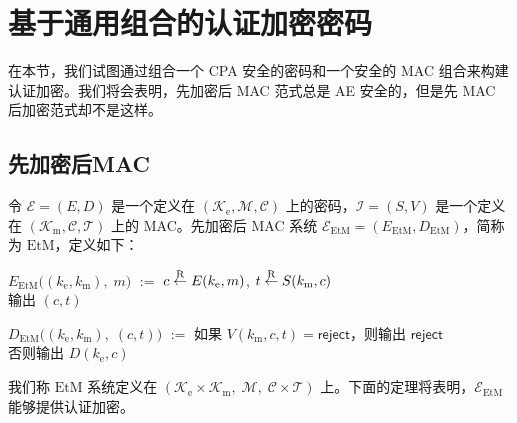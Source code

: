 \section{基于通用组合的认证加密密码}\label{sec:9-4}

在本节，我们试图通过组合一个 CPA 安全的密码和一个安全的 MAC 组合来构建认证加密。我们将会表明，先加密后 MAC 范式总是 AE 安全的，但是先 MAC 后加密范式却不是这样。

\subsection{先加密后MAC}\label{subsec:9-4-1}

令 $\mathcal{E}=(E,D)$ 是一个定义在 $(\mathcal{K}_\mathrm{e},\mathcal{M},\mathcal{C})$ 上的密码，$\mathcal{I}=(S,V)$ 是一个定义在 $(\mathcal{K}_\mathrm{m},\mathcal{C},\mathcal{T})$ 上的 MAC。先加密后 MAC 系统 $\mathcal{E}_\mathrm{EtM}=(E_\mathrm{EtM},D_\mathrm{EtM})$，简称为 $\mathrm{EtM}$，定义如下：

\vspace*{10pt}

\hspace*{20pt} $E_\mathrm{EtM}\big((k_\mathrm{e},k_\mathrm{m}),\;m\big)$
				\quad $:=$ \quad
				$c\overset{\rm R}\leftarrow E(k_\mathrm{e},m)$,
				\quad
				$t\overset{\rm R}\leftarrow S(k_\mathrm{m},c)$\\
\hspace*{165.5pt} 输出 $(c,t)$

\vspace*{5pt}

\hspace*{7pt} $D_\mathrm{EtM}\big((k_\mathrm{e},k_\mathrm{m}),\;(c,t)\big)$
				\quad $:=$ \quad
				如果 $V(k_\mathrm{m},c,t)=\mathsf{reject}$，则输出 $\mathsf{reject}$\\
\hspace*{165.5pt} 否则输出 $D(k_\mathrm{e},c)$

\vspace*{10pt}

\noindent
我们称 $\mathrm{EtM}$ 系统定义在 $(\mathcal{K}_\mathrm{e}\times\mathcal{K}_\mathrm{m},\;\mathcal{M},\;\mathcal{C}\times\mathcal{T})$ 上。下面的定理将表明，$\mathcal{E}_\mathrm{EtM}$ 能够提供认证加密。

